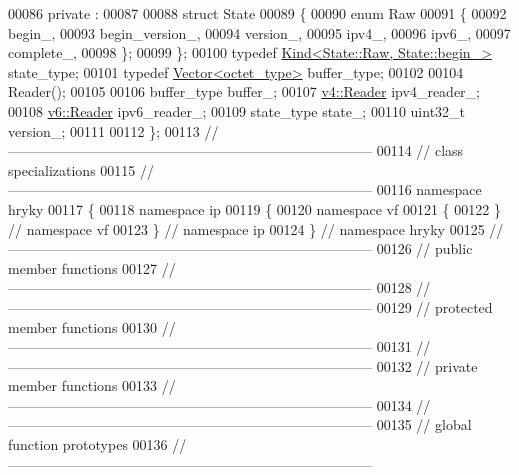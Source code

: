 \begin{DoxyCode}
00086 \textcolor{keyword}{private} :
00087 
00088     \textcolor{keyword}{struct }State
00089     \{
00090         \textcolor{keyword}{enum} Raw
00091         \{
00092             begin\_,
00093             begin\_version\_,
00094             version\_,
00095             ipv4\_,
00096             ipv6\_,
00097             complete\_,
00098         \};
00099     \};
00100     \textcolor{keyword}{typedef} \hyperlink{classhryky_1_1_kind}{Kind<State::Raw, State::begin_>} state\_type;
00101     \textcolor{keyword}{typedef} \hyperlink{classhryky_1_1_vector}{Vector<octet_type>} buffer\_type;
00102 
00104     Reader();
00105 
00106     buffer\_type buffer\_;
00107     \hyperlink{classhryky_1_1ip_1_1v4_1_1_reader}{v4::Reader}  ipv4\_reader\_;
00108     \hyperlink{classhryky_1_1ip_1_1v6_1_1_reader}{v6::Reader}  ipv6\_reader\_;
00109     state\_type  state\_;
00110     uint32\_t    version\_;
00111 
00112 \};
00113 \textcolor{comment}{//
      ------------------------------------------------------------------------------}
00114 \textcolor{comment}{// class specializations}
00115 \textcolor{comment}{//
      ------------------------------------------------------------------------------}
00116 \textcolor{keyword}{namespace }hryky
00117 \{
00118 \textcolor{keyword}{namespace }ip
00119 \{
00120 \textcolor{keyword}{namespace }vf
00121 \{
00122 \} \textcolor{comment}{// namespace vf}
00123 \} \textcolor{comment}{// namespace ip}
00124 \} \textcolor{comment}{// namespace hryky}
00125 \textcolor{comment}{//
      ------------------------------------------------------------------------------}
00126 \textcolor{comment}{// public member functions}
00127 \textcolor{comment}{//
      ------------------------------------------------------------------------------}
00128 \textcolor{comment}{//
      ------------------------------------------------------------------------------}
00129 \textcolor{comment}{// protected member functions}
00130 \textcolor{comment}{//
      ------------------------------------------------------------------------------}
00131 \textcolor{comment}{//
      ------------------------------------------------------------------------------}
00132 \textcolor{comment}{// private member functions}
00133 \textcolor{comment}{//
      ------------------------------------------------------------------------------}
00134 \textcolor{comment}{//
      ------------------------------------------------------------------------------}
00135 \textcolor{comment}{// global function prototypes}
00136 \textcolor{comment}{//
      ------------------------------------------------------------------------------}

\end{DoxyCode}
